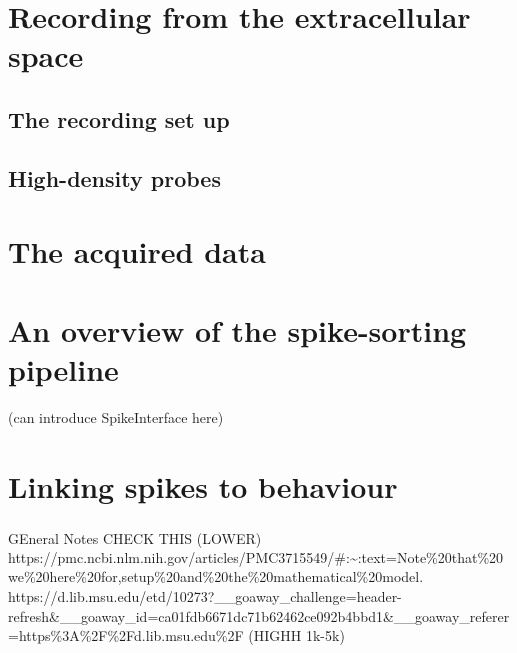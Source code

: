 \documentclass[
  letterpaper,
  DIV=11,
  numbers=noendperiod]{scrreprt}
\begin{document}

\section*{Recording from the extracellular
space}\label{recording-from-the-extracellular-space}


\subsection*{The recording set up}\label{the-recording-set-up}

\subsection*{High-density probes}\label{high-density-probes}

\section*{The acquired data}\label{the-acquired-data}


\section*{An overview of the spike-sorting
pipeline}\label{an-overview-of-the-spike-sorting-pipeline}


(can introduce SpikeInterface here)

\section*{Linking spikes to
behaviour}\label{linking-spikes-to-behaviour}


GEneral Notes \textsuperscript{}CHECK THIS (LOWER)
https://pmc.ncbi.nlm.nih.gov/articles/PMC3715549/\#:\textasciitilde:text=Note\%20that\%20we\%20here\%20for,setup\%20and\%20the\%20mathematical\%20model.
https://d.lib.msu.edu/etd/10273?\_\_goaway\_challenge=header-refresh\&\_\_goaway\_id=ca01fdb6671dc71b62462ce092b4bbd1\&\_\_goaway\_referer=https\%3A\%2F\%2Fd.lib.msu.edu\%2F
(HIGHH 1k-5k)
\end{document}
